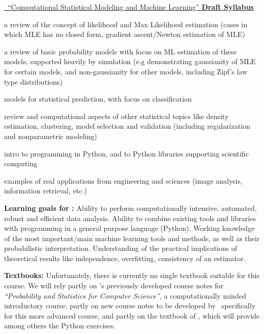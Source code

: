 \vskip 0.2in
\bit
\item  \underline{\statcl~``Computational Statistical Modeling and Machine Learning'' {\bf Draft Syllabus}} \\
\bit
\item a review of the concept of likelihood and Max Likelihood estimation (cases in which MLE has no closed form, gradient ascent/Newton estimation of MLE)
\item a review of basic probability models with focus on ML estimation of these models, supported heavily by simulation (e.g demonstrating gaussianity of MLE for certain models, and non-gaussianity for other models, including Zipf's law type distributions)
\item models for statistical prediction, with focus on classification
\item review and computational aspects of other statistical topics like
  density estimation, clustering, model selection and validation
  (including regularization and  nonparametric modeling)
\item intro to programming in Python, and to Python libraries supporting scientific computing
\item examples of real applications from engineering and sciences (image analysis, information retrieval, etc.)
\eit
\item[]{\bf Learning goals for \statcl:} Ability to perform computationally intensive, automated, robust and efficient data analysis. Ability to combine existing tools and libraries with programming in a general purpose language (Python). 
Working knowledge of the most important/main machine learning tools and methods, as well as their probabilistic interpretation. Understanding of the practical implications of theoretical results like independence, overfitting, consistency of an estimator. 

{\bf Textbooks:} Unfortunately, there is currently no single textbook
suitable for this course. We will rely partly on \meila's previously
developed course notes for {\it ``Probability and Statistics for
  Computer Science''}, a computationally minded introductory course,
partly on new course notes to be developed by \meila\ specifically for
this more advanced course, and partly on the textbook of \astrocl,
which will provide among others the Python exercises. %

